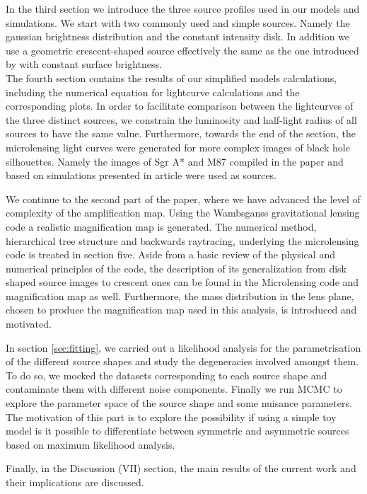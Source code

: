 In the third section we introduce the three source profiles used in our models and simulations. We start with two commonly used and simple sources. Namely the gaussian brightness distribution and the constant intensity disk. In addition we use a geometric crescent-shaped source effectively the same as the one introduced by \citep{2013MNRAS.434..765K} with constant surface brightness. \\ The fourth section contains the results of our simplified models calculations, including the numerical equation for lightcurve calculations and the corresponding plots. 
In order to facilitate comparison between the lightcurves of the three distinct sources, we constrain the luminosity and half-light radius of all sources to have the same value. 
Furthermore, towards the end of the section, the microlensing light curves were generated for more complex images of black hole silhouettes. 
Namely the images of Sgr A* and M87 compiled in the paper \citep{2015MNRAS.446.1973R} and based on simulations presented in \citep{2009MNRAS.394L.126M} article were used as sources.     
       
We continue to the second part of the paper, where we have advanced the level of complexity of the amplification map. Using the Wambsganss gravitational lensing code \citep{1990LNP...360..186W} a realistic magnification map is generated. The numerical method, hierarchical tree structure and backwards raytracing, underlying the microlensing code is treated in section five. Aside from a basic review of the physical and numerical principles of the code, the description of its generalization from disk shaped source images to crescent ones can be found in the Microlensing code and magnification map as well. Furthermore, the mass distribution in the lens plane, chosen to produce the magnification map used in this analysis, is introduced and motivated.   


In section \ref{sec:fitting}, we carried out a likelihood analysis for the parametrisation of the different source shapes and study the degeneracies involved amongst them. To do so, we mocked the datasets corresponding to each source shape and contaminate them with different noise components. Finally we run MCMC to explore the parameter space of the source shape and some nuisance parameters. The motivation of this part is to explore the possibility if using a simple toy model is it possible to differentiate between symmetric and asymmetric sources based on maximum likelihood analysis. 


Finally, in the Discussion (VII) section, the main results of the current work and their implications are discussed. 
